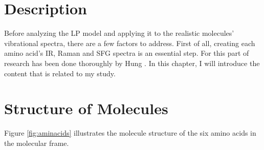  \label{ch:2}
\section{Description}
Before analyzing the LP model and applying it to the realistic molecules' vibrational spectra, there are a few factors to address. First of all, creating each amino acid's IR, Raman and SFG spectra is an essential step. For this part of research has been done thoroughly by Hung \cite{KuoKaiHung:Thesis:2015}. In this chapter, I will introduce the content that is related to my study. \\

\section{Structure of Molecules}
Figure \ref{fig:aminacids} illustrates the molecule structure of the six amino acids in the molecular frame.  
